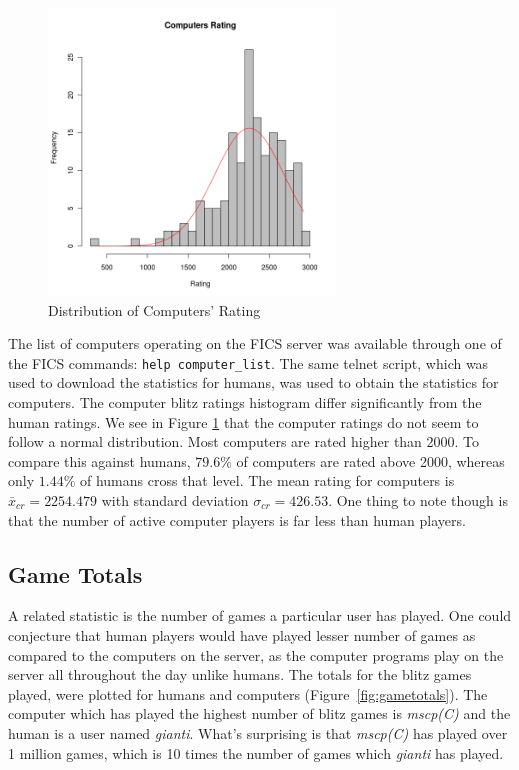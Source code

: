\documentclass{article}
\begin{document}
\begin{figure} [htp]
\begin{center}
\includegraphics[width=3in]{computers_rating.png}
\end{center}
\caption{Distribution of Computers' Rating}
\label{fig:comprating}
\end{figure}



The list of computers operating on the FICS server was available through one of the FICS commands: \verb=help computer_list=. The same telnet script, which was used to download the statistics for humans, was used to obtain the statistics for computers. The computer blitz ratings histogram differ significantly from the human ratings. We see in Figure \ref{fig:comprating} that the computer ratings do not seem to follow a normal distribution. Most computers are rated higher than 2000. To compare this against humans, $79.6\%$ of computers are rated above 2000, whereas only $1.44\%$ of humans cross that level. The mean rating for computers is $\bar{x}_{cr} = 2254.479$ with standard deviation $\sigma_{cr} = 426.53$. One thing to note though is that the number of active computer players is far less than human players.\\



\subsection{Game Totals}

A related statistic is the number of games a particular user has played. One could conjecture that human players would have played lesser number of games as compared to the computers on the server, as the computer programs play on the server all throughout the day unlike humans. The totals for the blitz games played, were plotted for humans and computers (Figure~\ref{fig:gametotals}). The computer which has played the highest number of blitz games is {\sl mscp(C)} and the human is a user named {\sl gianti}. What's surprising is that {\sl mscp(C)} has played over 1 million games, which is 10 times the number of games which {\sl gianti} has played.\\
\end{document}
